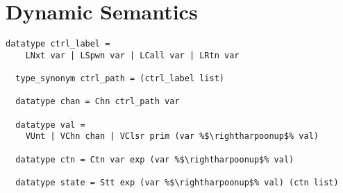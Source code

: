 \section{Dynamic Semantics}


\begin{lstlisting}[style=codestyle1, escapechar=\%]
  datatype ctrl_label = 
    LNxt var | LSpwn var | LCall var | LRtn var

  type_synonym ctrl_path = (ctrl_label list)

  datatype chan = Chn ctrl_path var

  datatype val = 
    VUnt | VChn chan | VClsr prim (var %$\rightharpoonup$% val)

  datatype ctn = Ctn var exp (var %$\rightharpoonup$% val)  

  datatype state = Stt exp (var %$\rightharpoonup$% val) (ctn list) 

  \end{lstlisting}


